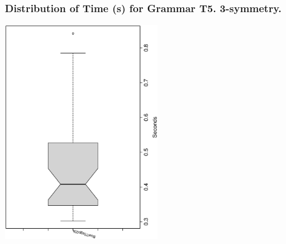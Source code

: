  \begin{frame}
 \frametitle{ Distribution of Time (s) for Grammar T5. 3-symmetry. }
 \begin{center}
\includegraphics[width=0.5\textwidth, angle=-90]
{ExpFboxplottSeconds001.eps}
 \end{center}
 \label{ExpFboxplottSeconds001.eps}  
 \end{frame}

